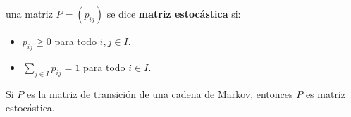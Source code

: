 \begin{definition}
una matriz $P = (p_{ij})$ se dice \textbf{matriz estocástica} si:
\begin{itemize}
    \item $p_{ij} \geq 0$ para todo $i,j \in I$.
    \item $\sum_{j\in I} p_{ij} = 1$ para todo $i\in I$.
\end{itemize}
\end{definition}

\begin{proposition}
Si $P$ es la matriz de transición de una cadena de Markov, entonces $P$ es matriz estocástica.
\end{proposition}